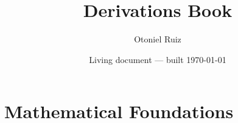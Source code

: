 \documentclass[11pt,a4paper,oneside]{book}
\title{Derivations Book}
\author{Otoniel Ruiz}
\date{Living document --- built \today}
\begin{document}
\frontmatter
\maketitle
\tableofcontents


\mainmatter
\part{Mathematical Foundations}

\end{document}
